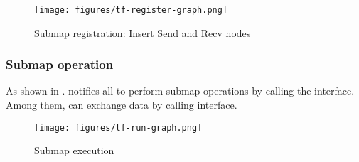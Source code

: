 \begin{content}
\begin{figure}[!htbp]
  \centering
  \texttt{[image: figures/tf-register-graph.png]}
  \caption{Submap registration: Insert Send and Recv nodes}
  \label{fig:tf-register-graph}
\end{figure}


\subsubsection{Submap operation}
As shown in .  notifies all  to perform submap operations by calling the  interface. Among them,  can exchange data by calling  interface.

\begin{figure}[!htbp]
  \centering
  \texttt{[image: figures/tf-run-graph.png]}
  \caption{Submap execution}
  \label{fig:tf-run-graph}
\end{figure}

\end{content}


